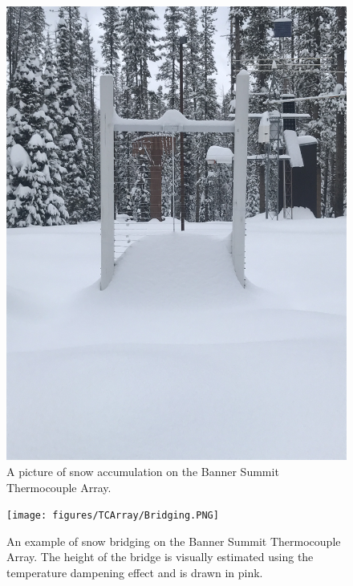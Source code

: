 \begin{figure}[H]
    \centering
    \includegraphics[width=0.9\linewidth]{figures/TCArray/Bridging_Photo.JPG}
    \caption{A picture of snow accumulation on the Banner Summit Thermocouple Array.}
    \label{fig:Bridging_Photo}
 \end{figure}

\begin{figure}[H]
    \centering
    \texttt{[image: figures/TCArray/Bridging.PNG]}
    \caption{An example of snow bridging on the Banner Summit Thermocouple Array. The height of the bridge is visually estimated using the temperature dampening effect and is drawn in pink.}
    \label{fig:Bridging_Heatmap}
 \end{figure}
 
 

